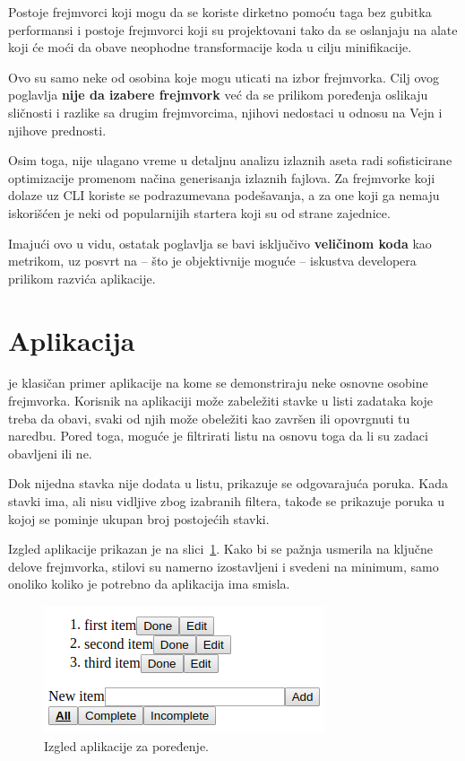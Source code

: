Postoje frejmvorci koji mogu da se koriste dirketno pomoću  taga bez gubitka performansi i postoje frejmvorci koji su projektovani tako da se oslanjaju na alate koji će moći da obave neophodne transformacije koda u cilju minifikacije.

Ovo su samo neke od osobina koje mogu uticati na izbor frejmvorka.
Cilj ovog poglavlja \textbf{nije da izabere  frejmvork} već da se prilikom poređenja oslikaju sličnosti i razlike sa drugim frejmvorcima, njihovi nedostaci u odnosu na Vejn i njihove prednosti.

Osim toga, nije ulagano vreme u detaljnu analizu izlaznih aseta radi sofisticirane optimizacije promenom načina generisanja izlaznih fajlova.
Za frejmvorke koji dolaze uz CLI koriste se podrazumevana podešavanja, a za one koji ga nemaju iskorišćen je neki od popularnijih startera koji su  od strane zajednice.

Imajući ovo u vidu, ostatak poglavlja se bavi isključivo \textbf{veličinom koda} kao metrikom, uz posvrt na -- što je objektivnije moguće -- iskustva developera prilikom razvića aplikacije.

\section{Aplikacija}
\label{subsec:app}

 je klasičan primer aplikacije na kome se demonstriraju neke osnovne osobine frejmvorka.
Korisnik na aplikaciji može zabeležiti stavke u listi zadataka koje treba da obavi, svaki od njih može obeležiti kao završen ili opovrgnuti tu naredbu.
Pored toga, moguće je filtrirati listu na osnovu toga da li su zadaci obavljeni ili ne.

Dok nijedna stavka nije dodata u listu, prikazuje se odgovarajuća poruka.
Kada stavki ima, ali nisu vidljive zbog izabranih filtera, takođe se prikazuje poruka u kojoj se pominje ukupan broj postojećih stavki.

Izgled aplikacije prikazan je na slici~\ref{fig:izgled-app}. Kako bi se pažnja usmerila na ključne delove frejmvorka, stilovi su namerno izostavljeni i svedeni na minimum, samo onoliko koliko je potrebno da aplikacija ima smisla.

\begin{figure}
  \centering
  \includegraphics[scale=0.5]{ch06/app.png}
  \caption{Izgled aplikacije za poređenje.}
  \label{fig:izgled-app}
\end{figure}

